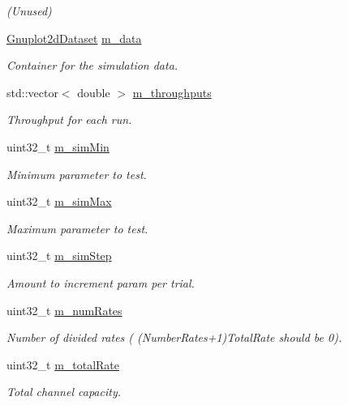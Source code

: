 \begin{DoxyCompactItemize}
\begin{DoxyCompactList}\small\item\em (Unused) \end{DoxyCompactList}\item 
\hyperlink{classns3_1_1Gnuplot2dDataset}{Gnuplot2d\+Dataset} \hyperlink{classExperiment_a5fe417dad739b40ddbf9ee144842ce8f}{m\+\_\+data}
\begin{DoxyCompactList}\small\item\em Container for the simulation data. \end{DoxyCompactList}\item 
std\+::vector$<$ double $>$ \hyperlink{classExperiment_aaacf74af811020eeb7fb850b2277c054}{m\+\_\+throughputs}
\begin{DoxyCompactList}\small\item\em Throughput for each run. \end{DoxyCompactList}\item 
uint32\+\_\+t \hyperlink{classExperiment_a1e89e71ab70949905316be28953a792e}{m\+\_\+sim\+Min}
\begin{DoxyCompactList}\small\item\em Minimum parameter to test. \end{DoxyCompactList}\item 
uint32\+\_\+t \hyperlink{classExperiment_a8eb0623f0942827bc464344394072ebb}{m\+\_\+sim\+Max}
\begin{DoxyCompactList}\small\item\em Maximum parameter to test. \end{DoxyCompactList}\item 
uint32\+\_\+t \hyperlink{classExperiment_a467fcd8d0cf8bd7a76b399a6cd649a35}{m\+\_\+sim\+Step}
\begin{DoxyCompactList}\small\item\em Amount to increment param per trial. \end{DoxyCompactList}\item 
uint32\+\_\+t \hyperlink{classExperiment_abdde6720121e71224882f7b87536d6ff}{m\+\_\+num\+Rates}
\begin{DoxyCompactList}\small\item\em Number of divided rates ( (Number\+Rates+1)Total\+Rate should be 0). \end{DoxyCompactList}\item 
uint32\+\_\+t \hyperlink{classExperiment_a5259793f074543984f6bcf15b8add220}{m\+\_\+total\+Rate}
\begin{DoxyCompactList}\small\item\em Total channel capacity. \end{DoxyCompactList}\item 

\end{DoxyCompactItemize}
